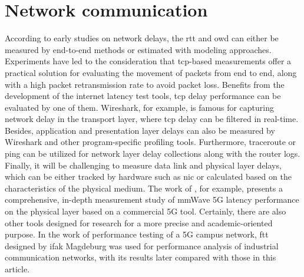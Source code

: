 \section{Network communication}
According to early studies on network delays, the \gls{rtt} and \gls{owd} 
can either be measured by end-to-end methods or estimated with modeling 
approaches. Experiments have led to the consideration that \gls{tcp}-based 
measurements offer a practical solution for evaluating the movement of 
packets from end to end, along with a high packet retransmission rate 
to avoid packet loss\cite{paxson_end--end_1999}. Benefits from 
the development of the internet latency test tools, \gls{tcp} delay 
performance can be evaluated by one of them. Wireshark, for example, is famous 
for capturing network delay in the transport layer, where \gls{tcp} delay 
can be filtered in real-time\cite{dsouza_transmission_2020}. Besides, 
application and presentation layer delays can also be measured by Wireshark and 
other program-specific profiling tools\cite{heger_application_2017}. Furthermore, 
traceroute or ping can be utilized 
for network layer delay collections along with the router logs\cite{Deri2003}. 
Finally, it will be challenging to measure 
data link and physical layer delays, which can be either tracked by hardware 
such as \gls{nic} or calculated based on the characteristics 
of the physical medium. The work of \cite{Fezeu2023}, for example, 
presents a comprehensive, 
in-depth measurement study of mmWave 5G latency performance on the physical layer 
based on a commercial 5G tool.   
Certainly, there are also other tools designed for research for a more 
precise and academic-oriented purpose. In the work of performance testing 
of a 5G campus network, \gls{ftt} designed by ifak Magdeburg was used 
for performance analysis of industrial communication networks\cite{cainelli_performance_2023}, 
with its results later compared with those in this article.


